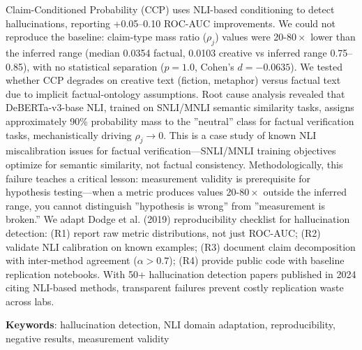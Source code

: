 
Claim-Conditioned Probability (CCP) uses NLI-based conditioning to detect hallucinations, reporting +0.05--0.10 ROC-AUC improvements. We could not reproduce the baseline: claim-type mass ratio ($\rho_j$) values were 20-$80\times$ lower than the inferred range (median 0.0354 factual, 0.0103 creative vs inferred range 0.75--0.85), with no statistical separation ($p = 1.0$, Cohen's $d = -0.0635$). We tested whether CCP degrades on creative text (fiction, metaphor) versus factual text due to implicit factual-ontology assumptions. Root cause analysis revealed that DeBERTa-v3-base NLI, trained on SNLI/MNLI semantic similarity tasks, assigns approximately 90\% probability mass to the ''neutral'' class for factual verification tasks, mechanistically driving $\rho_j \to 0$. This is a case study of known NLI miscalibration issues for factual verification---SNLI/MNLI training objectives optimize for semantic similarity, not factual consistency. Methodologically, this failure teaches a critical lesson: measurement validity is prerequisite for hypothesis testing---when a metric produces values 20-$80\times$ outside the inferred range, you cannot distinguish ''hypothesis is wrong'' from ''measurement is broken.'' We adapt Dodge et al. (2019) reproducibility checklist for hallucination detection: (R1) report raw metric distributions, not just ROC-AUC; (R2) validate NLI calibration on known examples; (R3) document claim decomposition with inter-method agreement ($\alpha > 0.7$); (R4) provide public code with baseline replication notebooks. With 50+ hallucination detection papers published in 2024 citing NLI-based methods, transparent failures prevent costly replication waste across labs.

\textbf{Keywords}: hallucination detection, NLI domain adaptation, reproducibility, negative results, measurement validity
